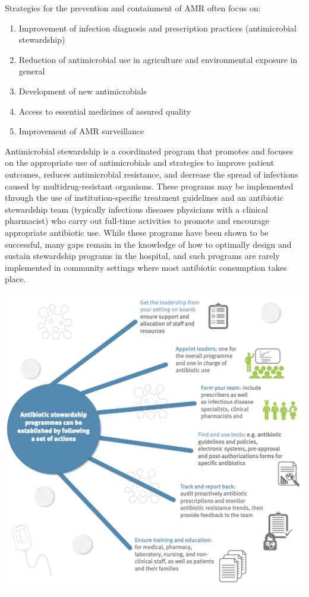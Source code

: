 \documentclass[
]{book}
\providecommand{\tightlist}{%
  \setlength{\itemsep}{0pt}\setlength{\parskip}{0pt}}
\begin{document}
Strategies for the prevention and containment of AMR often focus on:

\begin{enumerate}
\def\labelenumi{\arabic{enumi}.}
\tightlist
\item
  Improvement of infection diagnosis and prescription practices (antimicrobial stewardship)
\item
  Reduction of antimicrobial use in agriculture and environmental exposure in general
\item
  Development of new antimicrobials
\item
  Access to essential medicines of assured quality
\item
  Improvement of AMR surveillance
\end{enumerate}

Antimicrobial stewardship is a coordinated program that promotes and focuses on the appropriate use of antimicrobials and strategies to improve patient outcomes, reduces antimicrobial resistance, and decrease the spread of infections caused by multidrug-resistant organisms. These programs may be implemented through the use of institution-specific treatment guidelines and an antibiotic stewardship team (typically infectious diseases physicians with a clinical pharmacist) who carry out full-time activities to promote and encourage appropriate antibiotic use. While these programs have been shown to be successful, many gaps remain in the knowledge of how to optimally design and sustain stewardship programs in the hospital, and such programs are rarely implemented in community settings where most antibiotic consumption takes place.

\includegraphics[width=8.33333in,height=\textheight]{images/stewardship actions.png}
\end{document}
